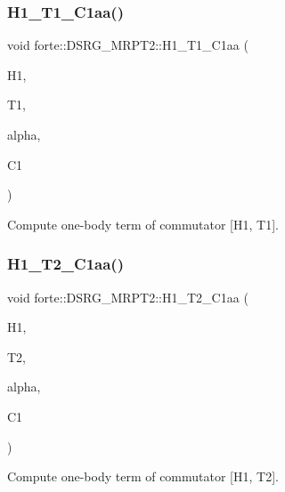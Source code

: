 \subsubsection{\texorpdfstring{H1\+\_\+\+T1\+\_\+\+C1aa()}{H1\_T1\_C1aa()}}
{\footnotesize\ttfamily void forte\+::\+D\+S\+R\+G\+\_\+\+M\+R\+P\+T2\+::\+H1\+\_\+\+T1\+\_\+\+C1aa (\begin{DoxyParamCaption}\item[{Blocked\+Tensor \&}]{H1,  }\item[{Blocked\+Tensor \&}]{T1,  }\item[{const double \&}]{alpha,  }\item[{Blocked\+Tensor \&}]{C1 }\end{DoxyParamCaption})\hspace{0.3cm}{\ttfamily [protected]}}



Compute one-\/body term of commutator \mbox{[}H1, T1\mbox{]}. 

\mbox{\label{classforte_1_1_d_s_r_g___m_r_p_t2_a2f9f75d569a3f7e0089c5a7e149dfb6f}} 
\subsubsection{\texorpdfstring{H1\+\_\+\+T2\+\_\+\+C1aa()}{H1\_T2\_C1aa()}}
{\footnotesize\ttfamily void forte\+::\+D\+S\+R\+G\+\_\+\+M\+R\+P\+T2\+::\+H1\+\_\+\+T2\+\_\+\+C1aa (\begin{DoxyParamCaption}\item[{Blocked\+Tensor \&}]{H1,  }\item[{Blocked\+Tensor \&}]{T2,  }\item[{const double \&}]{alpha,  }\item[{Blocked\+Tensor \&}]{C1 }\end{DoxyParamCaption})\hspace{0.3cm}{\ttfamily [protected]}}



Compute one-\/body term of commutator \mbox{[}H1, T2\mbox{]}. 

\mbox{\label{classforte_1_1_d_s_r_g___m_r_p_t2_a09f8f3de3f9160f9c573b8180cf4d78c}} 
